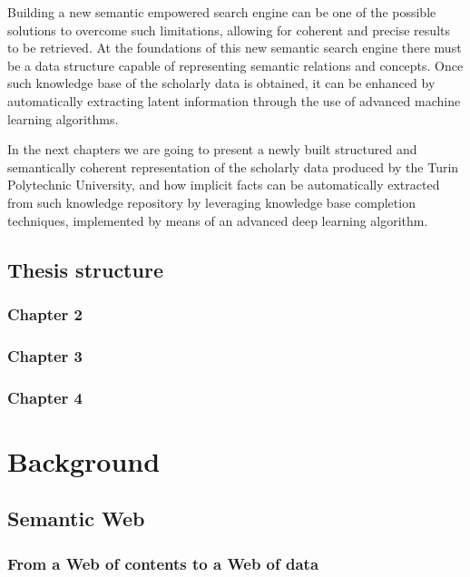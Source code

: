 \documentclass[%
    corpo=13.5pt,
    twoside,
    oldstyle,
    tipotesi=magistrale,
    greek,
    evenboxes
]{toptesi}
\begin{document}
Building a new semantic empowered search engine can be one of the
possible solutions to overcome such limitations, allowing for coherent and
precise results to be retrieved.
At the foundations of this new semantic search engine there must be a data
structure capable of representing semantic relations and concepts. Once such
knowledge base of the scholarly data is obtained, it can be enhanced by
automatically extracting latent information through the use of advanced
machine learning algorithms.

In the next chapters we are going to present a newly built structured and
semantically coherent representation of the scholarly data produced by the
Turin Polytechnic University, and how implicit facts can be automatically
extracted from such knowledge repository by leveraging knowledge base
completion techniques, implemented by means of an advanced deep learning
algorithm.


\section{Thesis structure}

\subsection{Chapter 2}

\subsection{Chapter 3}

\subsection{Chapter 4}



\chapter{Background}

\section{Semantic Web}

\subsection{From a Web of contents to a Web of data}
\end{document}
